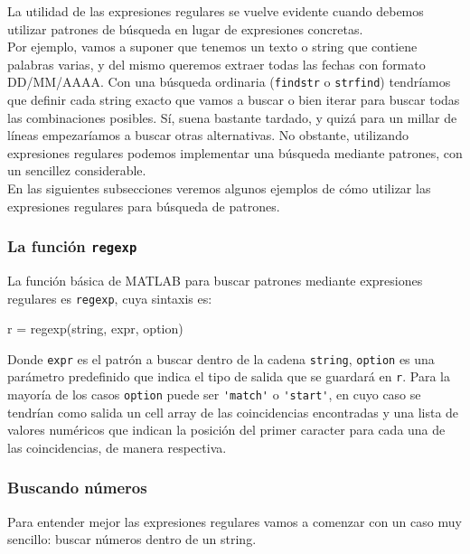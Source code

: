 La utilidad de las expresiones regulares se vuelve evidente cuando
debemos utilizar patrones de búsqueda en lugar de expresiones concretas. \\

Por ejemplo, vamos a suponer que tenemos un texto o string que contiene
palabras varias, y del mismo queremos extraer todas las fechas con
formato DD/MM/AAAA. Con una búsqueda ordinaria (\texttt{findstr} o
\texttt{strfind}) tendríamos que definir cada string exacto que vamos a
buscar o bien iterar para buscar todas las combinaciones posibles. Sí,
suena bastante tardado, y quizá para un millar de líneas empezaríamos a
buscar otras alternativas. No obstante, utilizando expresiones regulares
podemos implementar una búsqueda mediante patrones, con un sencillez
considerable. \\

En las siguientes subsecciones veremos algunos ejemplos de cómo utilizar
las expresiones regulares para búsqueda de patrones.

\subsubsection{La función \texttt{regexp}}\label{la-funciuxf3n-regexp}

La función básica de MATLAB para buscar patrones mediante expresiones
regulares es \texttt{regexp}, cuya sintaxis es:

\begin{matlab}
r = regexp(string, expr, option)
\end{matlab}

Donde \texttt{expr} es el patrón a buscar dentro de la cadena
\texttt{string}, \texttt{option} es una parámetro predefinido que indica
el tipo de salida que se guardará en \texttt{r}. Para la mayoría de los
casos \texttt{option} puede ser
\verb|'match'| o \verb|'start'|, en cuyo caso se
tendrían como salida un cell array de las coincidencias encontradas y
una lista de valores numéricos que indican la posición del primer
caracter para cada una de las coincidencias, de manera respectiva.

\subsubsection{Buscando números}\label{buscando-numeros}

Para entender mejor las expresiones regulares vamos a comenzar con un
caso muy sencillo: buscar números dentro de un string. \\


